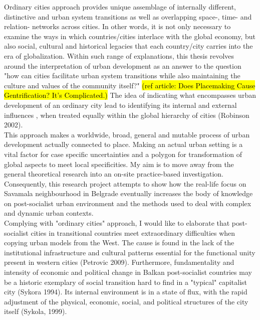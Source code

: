 \documentclass[11pt]{report}
\begin{document}
Ordinary cities approach provides unique assemblage of internally different, distinctive and  urban system transitions as well as overlapping space-, time- and relation- networks across cities. In other words, it is not only necessary to examine the ways in which countries/cities interlace with the global economy, but also social, cultural and historical legacies that each country/city carries into the era of globalization. Within such range of explanations, this thesis revolves around the interpretation of urban development as an answer to the question "how can cities facilitate urban system transitions while also maintaining the culture and values of the community itself?" \hl{(ref article: Does Placemaking Cause Gentrification? It’s Complicated.)} The idea of indicating what encompasses urban development of an ordinary city lead to identifying its internal and external influences , when treated equally within the global hierarchy of cities (Robinson 2002). 
\\
This approach makes a worldwide, broad, general and mutable process of urban development actually connected to place. Making an actual urban setting is a vital factor for case specific uncertainties and a polygon for transformation of global aspects to meet local specificities. My aim is to move away from the general theoretical research into an on-site practice-based investigation. Consequently, this research project attempts to show how the real-life focus on Savamala neighbourhood in Belgrade eventually increases the body of knowledge on post-socialist urban environment and the methods used to deal with complex and dynamic urban contexts.
\\
Complying with "ordinary cities" approach, I would like to elaborate that post-socialist cities in transitional countries meet extraordinary difficulties when copying urban models from the West.  The cause is found in the lack of the institutional infrastructure and cultural patterns essential for the functional unity present in western cities (Petrovic 2009). Furthermore, fundamentality and intensity of economic and political change in Balkan post-socialist countries may be a historic exemplary of social transition hard to find in a "typical" capitalist city (Sykora 1994). Its internal environment is in a state of flux, with the rapid adjustment of the physical, economic, social, and political structures of the city itself (Sykola, 1999).
\\
\end{document}
